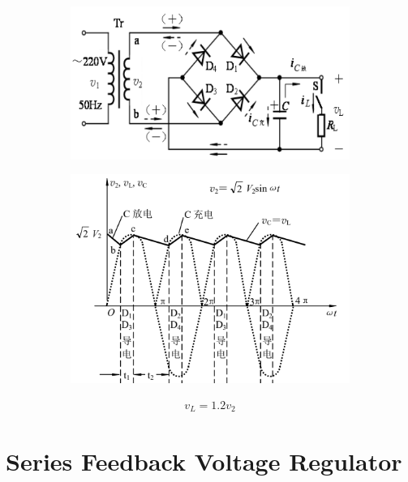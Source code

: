 \begin{figure}[H]
  \centering
  \begin{subfigure}{.5\textwidth}
    \centering
    \includegraphics[width=\linewidth]{figures/Filter-1}
  \end{subfigure}
  \begin{subfigure}{.45\textwidth}
    \centering
    \includegraphics[width=\linewidth]{figures/Filter-2}
  \end{subfigure}
\end{figure}

\begin{equation*}
  \begin{aligned}
    v_L = 1.2 v_2
  \end{aligned}
\end{equation*}

\section{Series Feedback Voltage Regulator}

